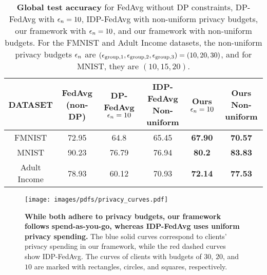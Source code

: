 \begin{table}[h!]
\centering
\caption{\textbf{Global test accuracy} for 
{FedAvg without DP constraints,} DP-FedAvg with ${\epsilon}_n=10$, IDP-FedAvg with non-uniform privacy budgets, our framework with ${\epsilon}_n=10$, and our framework with non-uniform budgets. For the FMNIST and Adult Income datasets, the non-uniform privacy budgets ${\epsilon}_n$ are $({\epsilon}_{\text{group},1},{\epsilon}_{\text{group},2},{\epsilon}_{\text{group},3})=(10,20,30)$, and for MNIST, they are $(10,15,20)$.}
\small
\setlength{\tabcolsep}{10pt} 
\renewcommand{\arraystretch}{1.2} 
\begin{tabular}{cccccc}
\toprule
\textbf{DATASET} & \makecell[tl]{
{\small \textbf{FedAvg}} \\ {\small (non-DP)}}  &  \makecell[tl]{{\small\textbf{DP-FedAvg}}\\ {\small ${\epsilon}_n=10$ }}  & \makecell[tl]{{\small \textbf{IDP-FedAvg}} \\ {\small Non-uniform}}& \makecell[tl]{{\small \textbf{Ours}} \\ {\small ${\epsilon}_n=10$ } } & \makecell[tl]{{\small \textbf{Ours}}\\ {\small {Non-uniform}}}  \\ 
\midrule  
FMNIST& 72.95 & 64.8 & 65.45 & \textbf{67.90} & \textbf{70.57}  \\  
\midrule 
MNIST & 90.23 &  76.79 & 76.94  & \textbf{80.2} & \textbf{83.83} \\
\midrule 
Adult Income & 78.93 &  60.12 &  70.93  & \textbf{72.14}  & \textbf{77.53}\\ 
\midrule
\end{tabular}
\label{tab:cmptable}
\centering \vspace{-1ex}
\end{table}

\begin{figure*}[!htbp]
    \centering
    \vspace{5pt}  
        \centering
        \texttt{[image: images/pdfs/privacy\_curves.pdf]}
    \caption{\textbf{While both adhere to privacy budgets, our framework follows spend-as-you-go, whereas IDP-FedAvg uses uniform privacy spending.} The blue solid curves correspond to clients' privacy spending in our framework, while the red dashed curves show IDP-FedAvg. The curves of clients with budgets of $30$, $20$, and $10$ are marked with rectangles, circles, and squares, respectively.  
    }    
    \label{fig:privacyparams}
    \centering \vspace{-2ex}
\end{figure*}

